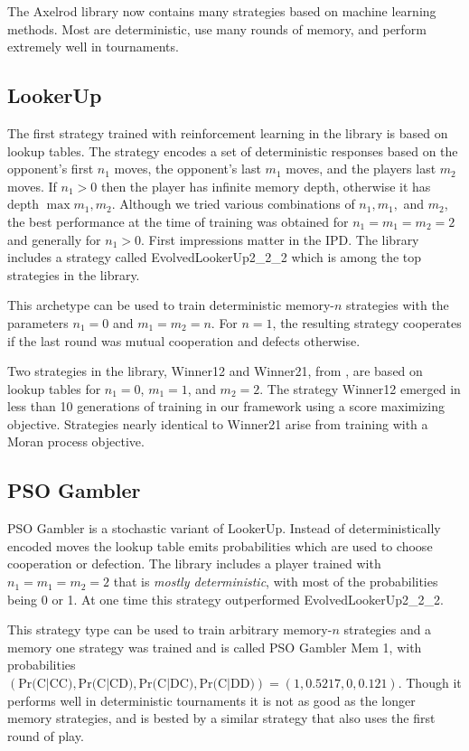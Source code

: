 \documentclass{article}
\begin{document}
The Axelrod library now contains many strategies based on machine learning
methods. Most are deterministic, use many rounds of memory, and perform
extremely well in tournaments.

\subsection{LookerUp}

The first strategy trained with reinforcement learning in the library is based
on lookup tables. The strategy encodes a set of deterministic responses
based on the opponent's first $n_1$ moves, the opponent's last $m_1$ moves, and
the players last $m_2$ moves. If $n_1 > 0$ then the player has infinite memory
depth, otherwise it has depth $\max{m_1, m_2}$. Although we tried various
combinations of $n_1, m_1,$ and $m_2$, the best performance at the time of
training was obtained for $n_1 = m_1 = m_2 = 2$ and generally for $n_1 > 0$.
First impressions matter in the IPD. The library includes a strategy
called EvolvedLookerUp2\_2\_2 which is among the top strategies in the library.

This archetype can be used to train deterministic memory-$n$ strategies with the
parameters $n_1=0$ and $m_1=m_2=n$. For $n=1$, the resulting strategy cooperates
if the last round was mutual cooperation and defects otherwise.

Two strategies in the library, Winner12 and Winner21, from \cite{Mathieu2015},
are based on lookup tables for $n_1 = 0$, $m_1 = 1$, and $m_2=2$. The strategy
Winner12 emerged in less than 10 generations of training in our framework using
a score maximizing objective. Strategies nearly identical to Winner21 arise
from training with a Moran process objective.

\subsection{PSO Gambler}

PSO Gambler is a stochastic variant of LookerUp. Instead of deterministically
encoded moves the lookup table emits probabilities which are
used to choose cooperation or defection. The library includes a player trained
with $n_1 = m_1 = m_2 = 2$ that is \emph{mostly deterministic}, with most of the
probabilities being 0 or 1. At one time this strategy outperformed
EvolvedLookerUp2\_2\_2.

This strategy type can be used to train arbitrary memory-$n$ strategies and a
memory one strategy was trained and is called PSO Gambler Mem 1, with
probabilities $(\text{Pr(C|CC)}, \text{Pr(C|CD)}, \text{Pr(C|DC)}, \text{Pr(C|DD)}) = (1, 0.5217, 0, 0.121)$. Though it performs well in deterministic tournaments
it is not as good as the longer memory strategies, and is bested by a similar
strategy that also uses the first round of play.
\end{document}
